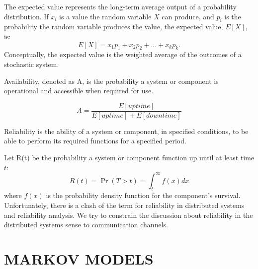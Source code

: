 The expected value represents the long-term average output of a probability distribution.
If $x_i$ is a value the random variable $X$ can produce, and $p_i$ is the probability the random variable produces the value, the expected value, $E[X]$, is:
\begin{equation}E[X] = x_1 p_1 + x_2 p_2 + ... + x_k p_k.\end{equation}
Conceptually, the expected value is the weighted average of the outcomes of a stochastic system.

\begin{pdef}
Availability, denoted as A, is the probability a system or component is operational and accessible when required for use.
\end{pdef}
\begin{equation}A = \frac{E[uptime]}{E[uptime]+E[downtime]}\end{equation}

\begin{pdef}
Reliability is the ability of a system or component, in specified conditions, to be able to perform its required functions for a specified period.
\end{pdef}

Let R(t) be the probability a system or component function up until at least time $t$:
\begin{equation}R(t) = \Pr(T > t) = \int_t^{\infty} f(x) dx\end{equation}
where $f(x)$ is the probability density function for the component's survival.
Unfortunately, there is a clash of the term for reliability in distributed systems and reliability analysis.
We try to constrain the discussion about reliability in the distributed systems sense to communication channels.

\section{MARKOV MODELS}


